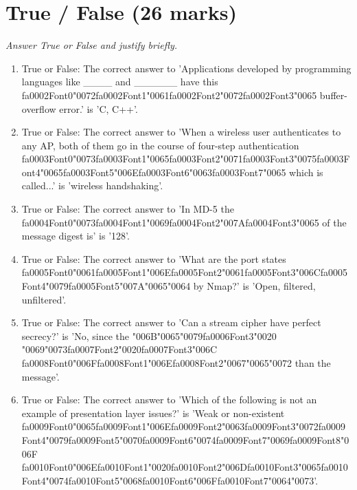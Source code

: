 \documentclass[12pt]{article}
\begin{document}
\section*{True / False (26 marks)}
\textit{Answer True or False and justify briefly.}
\begin{enumerate}[label=\arabic*.]
\item True or False: The correct answer to 'Applications developed by programming languages like \_\_\_\_ and \_\_\_\_\_\_ have this {\csname fa0002Font0\endcsname\char"0072}{\csname fa0002Font1\endcsname\char"0061}{\csname fa0002Font2\endcsname\char"0072}{\csname fa0002Font3\endcsname\char"0065} buffer-overflow error.' is 'C, C++'.
\item True or False: The correct answer to 'When a wireless user authenticates to any AP, both of them go in the course of four-step authentication {\csname fa0003Font0\endcsname\char"0073}{\csname fa0003Font1\endcsname\char"0065}{\csname fa0003Font2\endcsname\char"0071}{\csname fa0003Font3\endcsname\char"0075}{\csname fa0003Font4\endcsname\char"0065}{\csname fa0003Font5\endcsname\char"006E}{\csname fa0003Font6\endcsname\char"0063}{\csname fa0003Font7\endcsname\char"0065} which is called...' is 'wireless handshaking'.
\item True or False: The correct answer to 'In MD-5 the {\csname fa0004Font0\endcsname\char"0073}{\csname fa0004Font1\endcsname\char"0069}{\csname fa0004Font2\endcsname\char"007A}{\csname fa0004Font3\endcsname\char"0065} of the message digest is' is '128'.
\item True or False: The correct answer to 'What are the port states {\csname fa0005Font0\endcsname\char"0061}{\csname fa0005Font1\endcsname\char"006E}{\csname fa0005Font2\endcsname\char"0061}{\csname fa0005Font3\endcsname\char"006C}{\csname fa0005Font4\endcsname\char"0079}{\csname fa0005Font5\endcsname\char"007A}{\char"0065}{\char"0064} by Nmap?' is 'Open, filtered, unfiltered'.
\item True or False: The correct answer to 'Can a stream cipher have perfect secrecy?' is 'No, since the {\char"006B}{\char"0065}{\char"0079}{\csname fa0006Font3\endcsname\char"0020} {\char"0069}{\char"0073}{\csname fa0007Font2\endcsname\char"0020}{\csname fa0007Font3\endcsname\char"006C} {\csname fa0008Font0\endcsname\char"006F}{\csname fa0008Font1\endcsname\char"006E}{\csname fa0008Font2\endcsname\char"0067}{\char"0065}{\char"0072} than the message'.
\item True or False: The correct answer to 'Which of the following is not an example of presentation layer issues?' is 'Weak or non-existent {\csname fa0009Font0\endcsname\char"0065}{\csname fa0009Font1\endcsname\char"006E}{\csname fa0009Font2\endcsname\char"0063}{\csname fa0009Font3\endcsname\char"0072}{\csname fa0009Font4\endcsname\char"0079}{\csname fa0009Font5\endcsname\char"0070}{\csname fa0009Font6\endcsname\char"0074}{\csname fa0009Font7\endcsname\char"0069}{\csname fa0009Font8\endcsname\char"006F} {\csname fa0010Font0\endcsname\char"006E}{\csname fa0010Font1\endcsname\char"0020}{\csname fa0010Font2\endcsname\char"006D}{\csname fa0010Font3\endcsname\char"0065}{\csname fa0010Font4\endcsname\char"0074}{\csname fa0010Font5\endcsname\char"0068}{\csname fa0010Font6\endcsname\char"006F}{\csname fa0010Font7\endcsname\char"0064}{\char"0073}'.

\end{enumerate}
\end{document}
